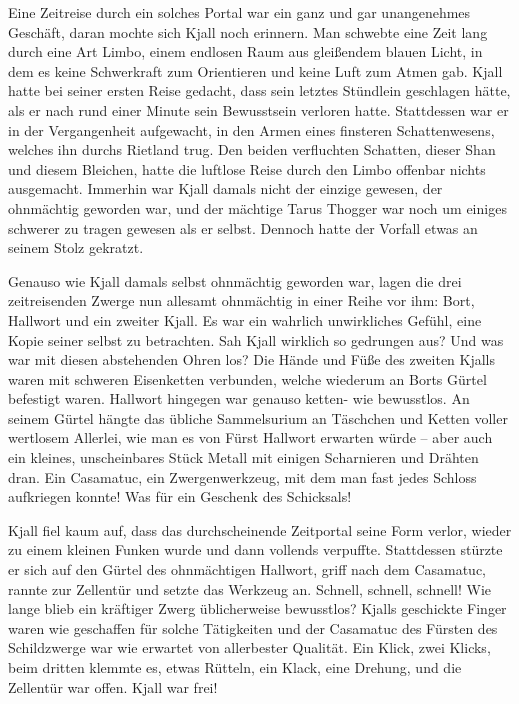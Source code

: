 Eine Zeitreise durch ein solches Portal war ein ganz und gar unangenehmes Geschäft, daran mochte sich Kjall noch erinnern. Man schwebte eine Zeit lang durch eine Art Limbo, einem endlosen Raum aus gleißendem blauen Licht, in dem es keine Schwerkraft zum Orientieren und keine Luft zum Atmen gab. Kjall hatte bei seiner ersten Reise gedacht, dass sein letztes Stündlein geschlagen hätte, als er nach rund einer Minute sein Bewusstsein verloren hatte. Stattdessen war er in der Vergangenheit aufgewacht, in den Armen eines finsteren Schattenwesens, welches ihn durchs Rietland trug. Den beiden verfluchten Schatten, dieser Shan und diesem Bleichen, hatte die luftlose Reise durch den Limbo offenbar nichts ausgemacht. Immerhin war Kjall damals nicht der einzige gewesen, der ohnmächtig geworden war, und der mächtige Tarus Thogger war noch um einiges schwerer zu tragen gewesen als er selbst. Dennoch hatte der Vorfall etwas an seinem Stolz gekratzt.

Genauso wie Kjall damals selbst ohnmächtig geworden war, lagen die drei zeitreisenden Zwerge nun allesamt ohnmächtig in einer Reihe vor ihm: Bort, Hallwort und ein zweiter Kjall. Es war ein wahrlich unwirkliches Gefühl, eine Kopie seiner selbst zu betrachten. Sah Kjall wirklich so gedrungen aus? Und was war mit diesen abstehenden Ohren los? Die Hände und Füße des zweiten Kjalls waren mit schweren Eisenketten verbunden, welche wiederum an Borts Gürtel befestigt waren. Hallwort hingegen war genauso ketten- wie bewusstlos. An seinem Gürtel hängte das übliche Sammelsurium an Täschchen und Ketten voller wertlosem Allerlei, wie man es von Fürst Hallwort erwarten würde – aber auch ein kleines, unscheinbares Stück Metall mit einigen Scharnieren und Drähten dran. Ein Casamatuc, ein Zwergenwerkzeug, mit dem man fast jedes Schloss aufkriegen konnte! Was für ein Geschenk des Schicksals!

Kjall fiel kaum auf, dass das durchscheinende Zeitportal seine Form verlor, wieder zu einem kleinen Funken wurde und dann vollends verpuffte. Stattdessen stürzte er sich auf den Gürtel des ohnmächtigen Hallwort, griff nach dem Casamatuc, rannte zur Zellentür und setzte das Werkzeug an. Schnell, schnell, schnell! Wie lange blieb ein kräftiger Zwerg üblicherweise bewusstlos? Kjalls geschickte Finger waren wie geschaffen für solche Tätigkeiten und der Casamatuc des Fürsten des Schildzwerge war wie erwartet von allerbester Qualität. Ein Klick, zwei Klicks, beim dritten klemmte es, etwas Rütteln, ein Klack, eine Drehung, und die Zellentür war offen. Kjall war frei!

